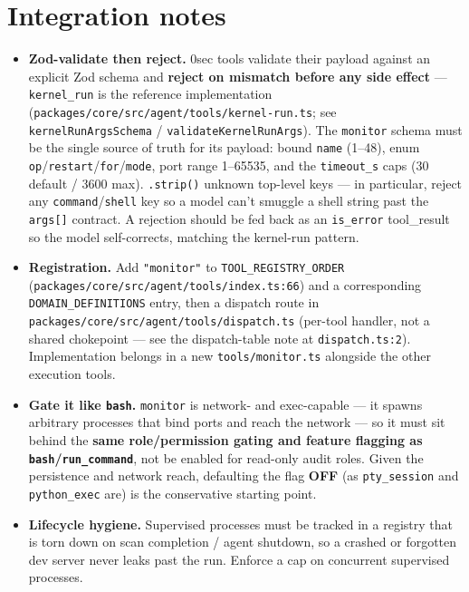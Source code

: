 \documentclass[11pt]{article}
\begin{document}
\section{Integration notes}

\begin{itemize}[leftmargin=*]
  \item \textbf{Zod-validate then reject.} 0sec tools validate their payload
  against an explicit Zod schema and \textbf{reject on mismatch before any side
  effect} --- \texttt{kernel\_run} is the reference implementation
  (\texttt{packages/core/src/agent/tools/kernel-run.ts}; see
  \texttt{kernelRunArgsSchema} / \texttt{validateKernelRunArgs}). The
  \texttt{monitor} schema must be the single source of truth for its payload:
  bound \texttt{name} (1--48), enum \texttt{op}/\texttt{restart}/\texttt{for}/\texttt{mode},
  port range 1--65535, and the \texttt{timeout\_s} caps (30 default / 3600 max).
  \texttt{.strip()} unknown top-level keys --- in particular, reject any
  \texttt{command}/\texttt{shell} key so a model can't smuggle a shell string past
  the \texttt{args[]} contract. A rejection should be fed back as an
  \texttt{is\_error} tool\_result so the model self-corrects, matching the
  kernel-run pattern.
  \item \textbf{Registration.} Add \texttt{"monitor"} to
  \texttt{TOOL\_REGISTRY\_ORDER} (\texttt{packages/core/src/agent/tools/index.ts:66})
  and a corresponding \texttt{DOMAIN\_DEFINITIONS} entry, then a dispatch route in
  \texttt{packages/core/src/agent/tools/dispatch.ts} (per-tool handler, not a
  shared chokepoint --- see the dispatch-table note at \texttt{dispatch.ts:2}).
  Implementation belongs in a new \texttt{tools/monitor.ts} alongside the other
  execution tools.
  \item \textbf{Gate it like \texttt{bash}.} \texttt{monitor} is network- and
  exec-capable --- it spawns arbitrary processes that bind ports and reach the
  network --- so it must sit behind the \textbf{same role/permission gating and
  feature flagging as \texttt{bash}/\texttt{run\_command}}, not be enabled for
  read-only audit roles. Given the persistence and network reach, defaulting the
  flag \textbf{OFF} (as \texttt{pty\_session} and \texttt{python\_exec} are) is the
  conservative starting point.
  \item \textbf{Lifecycle hygiene.} Supervised processes must be tracked in a
  registry that is torn down on scan completion / agent shutdown, so a crashed or
  forgotten dev server never leaks past the run. Enforce a cap on concurrent
  supervised processes.
\end{itemize}
\end{document}
